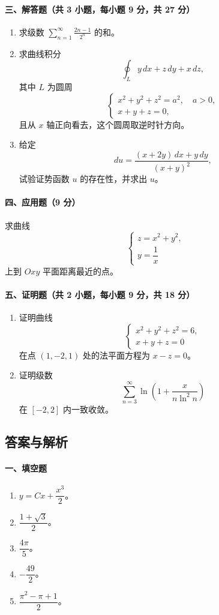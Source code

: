 \paragraph*{三、解答题（共 3 小题，每小题 9 分，共 27 分）}
\begin{enumerate}
  \item 求级数 $\displaystyle \sum_{n=1}^\infty \frac{2n-1}{2^n}$ 的和。
  \item 求曲线积分
  \[
    \oint_L y\,dx+z\,dy+x\,dz,
  \]
  其中 $L$ 为圆周
  \[
    \begin{cases}
      x^2+y^2+z^2=a^2,\quad a>0,\\
      x+y+z=0,
    \end{cases}
  \]
  且从 $x$ 轴正向看去，这个圆周取逆时针方向。
  \item 给定
  \[
    du=\frac{(x+2y)\,dx+y\,dy}{(x+y)^2},
  \]
  试验证势函数 $u$ 的存在性，并求出 $u$。
\end{enumerate}

\paragraph*{四、应用题（9 分）}
求曲线
\[
  \begin{cases}
    z=x^2+y^2,\\
    y=\dfrac1x
  \end{cases}
\]
上到 $Oxy$ 平面距离最近的点。

\paragraph*{五、证明题（共 2 小题，每小题 9 分，共 18 分）}
\begin{enumerate}
  \item 证明曲线
  \[
    \begin{cases}
      x^2+y^2+z^2=6,\\
      x+y+z=0
    \end{cases}
  \]
  在点 $(1,-2,1)$ 处的法平面方程为 $x-z=0$。
  \item 证明级数
  \[
    \sum_{n=3}^\infty \ln\left(1+\frac{x}{n\ln^2 n}\right)
  \]
  在 $[-2,2]$ 内一致收敛。
\end{enumerate}

\subsection{答案与解析}

\paragraph*{一、填空题}
\begin{enumerate}
  \item $y=Cx+\dfrac{x^3}{2}$。
  \item $\dfrac{1+\sqrt3}{2}$。
  \item $\dfrac{4\pi}{5}$。
  \item $-\dfrac{49}{2}$。
  \item $\dfrac{\pi^2-\pi+1}{2}$。
\end{enumerate}

